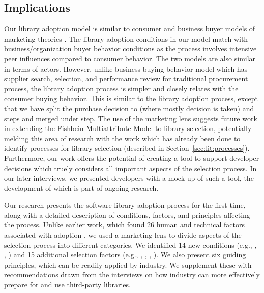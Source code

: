 \subsection{Implications} 


Our library adoption model is similar to consumer and business buyer models of marketing theories \cite{kotler2014principles}. The library adoption conditions in our model match with business/organization buyer behavior conditions as the process involves intensive peer influences compared to consumer behavior. The two models are also similar in terms of actors. However, unlike business buying behavior model which has supplier search, selection, and performance review for traditional procurement process, the library adoption process is simpler and closely relates with the consumer buying behavior. 
This is similar to the library adoption process, except that we have split the purchase decision to  (where mostly decision is taken) and  steps and merged  under  step. The use of the marketing lens suggests future work in extending the Fishbein Multiattribute Model \cite{fishbein1967attitude} to library selection, potentially melding this area of research with the work which has already been done to identify processes for library selection (described in Section~\ref{sec:lit:processes}). Furthermore, our work offers the potential of creating a tool to support developer decisions which truely considers all important aspects of the selection process. In our later interviews, we presented developers with a mock-up of such a tool, the development of which is part of ongoing research.


Our research presents the software library adoption process for the first time, along with a detailed description of conditions, factors, and principles affecting the process. Unlike earlier work, which found 26 human and technical factors associated with adoption \cite{larios2020selecting}, we used a marketing lens to divide aspects of the selection process into different categories. We identified 14 new conditions (e.g., , , ) and 15 additional selection factors (e.g., , , , ). 
We also present six guiding principles, which can be readily applied by industry. We supplement these with recommendations drawn from the interviews on how industry can more effectively prepare for and use third-party libraries. 

